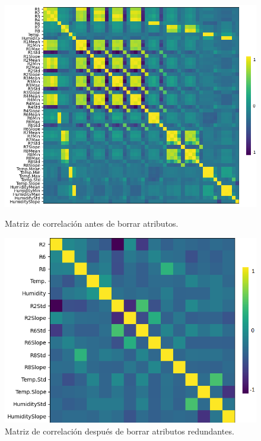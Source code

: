 \documentclass{esannV2}
\begin{document}
\begin{figure}[H]
\centering
\begin{minipage}{.48\textwidth}
  \includegraphics[width=\linewidth]{figuras/Correlation_mal.png}
  \caption{Matriz de correlación antes de borrar atributos.}\label{fig:corrMal}
\end{minipage}%
\quad
\begin{minipage}{.48\textwidth}
  \includegraphics[width=\linewidth]{figuras/Correlation_bien.png}
  \caption{Matriz de correlación después de borrar atributos redundantes.}
  \label{fig:corrBien}
\end{minipage}
\end{figure}
\noindent
\end{document}

